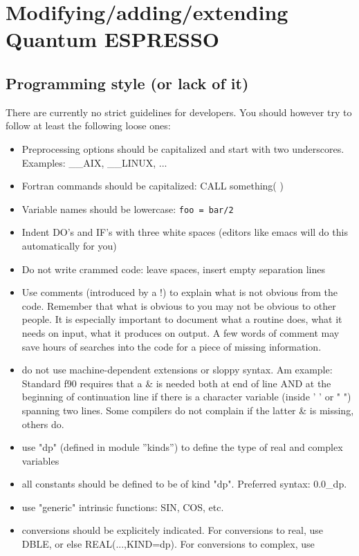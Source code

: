 \documentclass[12pt,a4paper]{article}
\def\qe{{\sc Quantum ESPRESSO}}
\begin{document}
\section{Modifying/adding/extending \qe}

\subsection{Programming style (or lack of it)}

There are currently no strict guidelines for developers. You
should however try to follow at least the following loose ones:
\begin{itemize}
\item Preprocessing options should be capitalized and start with 
two underscores. Examples: \_\_AIX, \_\_LINUX, ...
\item Fortran commands should be capitalized: 
CALL something( )
\item Variable names should be lowercase: \texttt{foo = bar/2}
\item Indent DO's and IF's with three white spaces (editors like emacs will do this automatically for you)
\item Do not write crammed code: leave spaces, insert empty separation lines
\item Use comments (introduced by a !) to explain what is not obvious from 
the code. Remember that what is obvious to you may not be obvious to other 
people. It is especially important to document what a routine does, what
it needs on input, what it produces on output. A few words of comment
may save hours of searches into the code for a piece of missing information.
\item do not use machine-dependent extensions or sloppy syntax. Am example:
Standard f90 
requires that a \& is needed both at end of line AND at the beginning of 
continuation line if there is a character variable (inside ' ' or " ")
spanning two lines. Some compilers do not complain if the latter \& is 
missing, others do.
\item use "dp" (defined in module ''kinds'') to define the type of real and complex variables
\item all constants should be defined to be of kind "dp".  Preferred syntax: 0.0\_dp.
\item use "generic" intrinsic functions: SIN, COS, etc.
\item conversions should be explicitely indicated. For conversions to real, 
use DBLE, or else REAL(...,KIND=dp). For conversions to complex, use 

\end{itemize}
\end{document}
